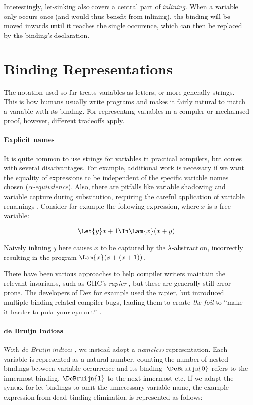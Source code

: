     Interestingly, let-sinking also covers a central part of \emph{inlining}.
    When a variable only occurs once (and would thus benefit from inlining),
    the binding will be moved inwards until it reaches the single occurence,
    which can then be replaced by the binding's declaration.

\section{Binding Representations}
\label{sec:binding-representations}
    The notation used so far treats variables as letters, or more generally strings.
    This is how humans usually write programs
    and makes it fairly natural to match a variable with its binding.
    For representing variables in a compiler or mechanised proof, however,
    different tradeoffs apply.
  \paragraph{Explicit names}
    It is quite common to use strings for variables in practical compilers,
    but comes with several disadvantages.
    For example, additional work is necessary
    if we want the equality of expressions to be independent of the specific variable names chosen
    (\emph{$\alpha$-equivalence}).
    Also, there are pitfalls like variable shadowing and variable capture during substitution,
    requiring the careful application of variable renamings
    \cite{Barendregt1985LambdaCalculus}.
    Consider for example the following expression, where $x$ is a free variable:

    \begin{align*}
      \Let{y} x + 1 \In \Lam{x} (x + y)
    \end{align*}

    Naively inlining $y$ here causes $x$ to be captured
    by the $\lambda$-abstraction, incorrectly resulting in the program
    $\Lam{x} (x + (x + 1))$.

    There have been various approaches to help compiler writers
    maintain the relevant invariants,
    such as GHC's \emph{rapier} \cite{Jones2002GHCInliner},
    but these are generally still error-prone.
    The developers of Dex for example used the rapier,
    but introduced multiple binding-related compiler bugs,
    leading them to create \emph{the foil}
    to ``make it harder to poke your eye out''
    \cite{Maclaurin2022Foil}.

  \paragraph{de Bruijn Indices}
    With \emph{de Bruijn indices}
    \cite{DeBruijn1972NamelessIndices},
    we instead adopt a \emph{nameless} representation.
    Each variable is represented as a natural number,
    counting the number of nested bindings between variable occurrence and its binding:
    $\DeBruijn{0}$ refers to the innermost binding, $\DeBruijn{1}$ to the next-innermost etc.
    If we adapt the syntax for let-bindings to omit the unnecessary variable name,
    the example expression from dead binding elimination is represented as follows:

